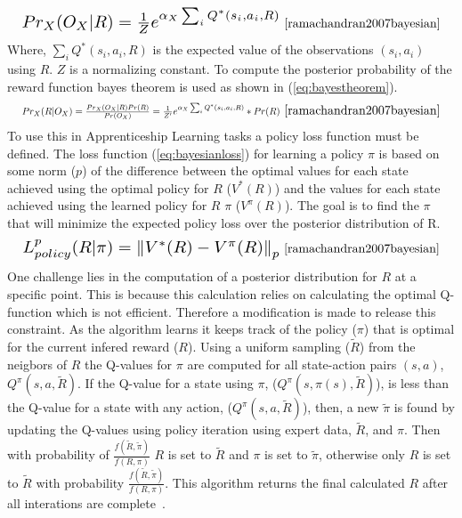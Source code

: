 \documentclass[12pt,american]{report}
\begin{document}
\begin{equation}
            \label{eq:bayseianliklihood}
            \resizebox{0.60\textwidth}{!}{$Pr_X(O_X|R) =  \frac{1}{Z}e^{\alpha_X\sum_{i}^{}Q^*(s_i,a_i,R)}$}~\cite{ramachandran2007bayesian}%
        \end{equation}
Where, $\sum_{i}^{}Q^*(s_i,a_i,R)$ is the expected value of the observations $(s_i,a_i)$ using $R$. $Z$ is a normalizing constant. To compute the posterior probability of the reward function bayes theorem is used as shown in (\ref{eq:bayestheorem}).
\begin{equation}
            \label{eq:bayestheorem}
            \resizebox{0.60\textwidth}{!}{$Pr_X(R|O_X) =  \frac{Pr_X(O_X|R)Pr(R)}{Pr(O_X)}= \frac{1}{Z'}e^{\alpha_X\sum_{i}^{}Q^*(s_i,a_i,R)}*Pr(R)$}~\cite{ramachandran2007bayesian}%
        \end{equation}
To use this in Apprenticeship Learning tasks a policy loss function must be defined. The loss function (\ref{eq:bayesianloss}) for learning a policy $\pi$ is based on some norm ($p$) of the difference between the optimal values for each state achieved using the optimal policy for $R$ ($V^*(R)$) and the values for each state achieved using the learned policy for $R$ $\pi$ ($V^\pi(R)$).  The goal is to find the $\pi$ that will minimize the expected policy loss over the posterior distribution of R.  
\begin{equation}
            \label{eq:bayesianloss}
            \resizebox{0.60\textwidth}{!}{$L_{policy}^{p}(R|\pi)=\norm{V^*(R)-V^\pi(R)}_p$}~\cite{ramachandran2007bayesian}%
        \end{equation}
One challenge lies in the computation of a posterior distribution for $R$ at a specific point.  This is because this calculation relies on calculating the optimal Q-function which is not efficient.  Therefore a modification is made to release this constraint.  As the algorithm learns it keeps track of the policy ($\pi$) that is optimal for the current infered reward ($R$).  Using a uniform sampling ($\tilde{R}$) from the neigbors of $R$ the Q-values for $\pi$ are computed for all state-action pairs $(s,a)$, $Q^\pi(s,a,\tilde{R})$. If the Q-value for a state using $\pi$, ($Q^\pi(s,\pi(s),\tilde{R})$), is less than the Q-value for a state with any action, ($Q^\pi(s,a,\tilde{R})$), then, a new $\tilde{\pi}$ is found by updating the Q-values using policy iteration using expert data, $\tilde{R}$, and $\pi$. Then with probability of $\frac{f(\tilde{R},\tilde{\pi})}{f(R,\pi)}$ $R$ is set to $\tilde{R}$ and $\pi$ is set to $\tilde{\pi}$, otherwise only $R$ is set to $\tilde{R}$  with probability $\frac{f(\tilde{R},\tilde{\pi})}{f(R,\pi)}$.  This algorithm returns the final calculated $R$ after all interations are complete~\cite{ramachandran2007bayesian}.
\end{document}
